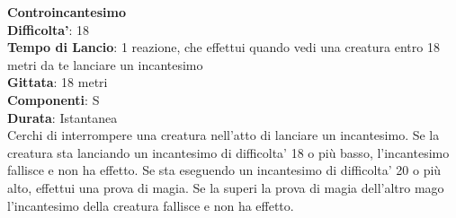 \begin{multicols}{2}
\medskip\textbf{Controincantesimo}\\
\textbf{Difficolta'}: 18\\
\textbf{Tempo di Lancio}: 1 reazione, che effettui quando vedi una creatura entro 18 metri da te lanciare un incantesimo\\
\textbf{Gittata}: 18 metri\\
\textbf{Componenti}: S \\
\textbf{Durata}: Istantanea\\
Cerchi di interrompere una creatura nell’atto di lanciare un incantesimo. Se la creatura sta lanciando un incantesimo di difficolta' 18 o più basso, l’incantesimo fallisce e non ha effetto. Se sta eseguendo un incantesimo di difficolta' 20 o più alto, effettui una prova di magia.
Se la superi la prova di magia dell'altro mago l’incantesimo della creatura fallisce e non ha effetto. 



\end{multicols}
